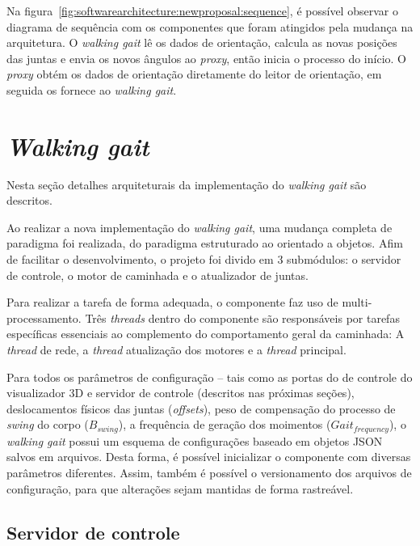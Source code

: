 Na figura~\ref{fig:softwarearchitecture:newproposal:sequence}, é possível observar o diagrama de sequência com os componentes que foram atingidos pela mudança na arquitetura. O \textit{walking gait} lê os dados de orientação, calcula as novas posições das juntas e envia os novos ângulos ao \textit{proxy}, então inicia o processo do início. O \textit{proxy} obtém os dados de orientação diretamente do leitor de orientação, em seguida os fornece ao \textit{walking gait}.

\section{\textit{Walking gait}}

Nesta seção detalhes arquiteturais da implementação do \textit{walking gait} são descritos.

Ao realizar a nova implementação do \textit{walking gait}, uma mudança completa de paradigma foi realizada, do paradigma estruturado ao orientado a objetos. Afim de facilitar o desenvolvimento, o projeto foi divido em $3$ submódulos: o servidor de controle, o motor de caminhada e o atualizador de juntas.

Para realizar a tarefa de forma adequada, o componente faz uso de multi-processamento. Três \textit{threads} dentro do componente são responsáveis por tarefas específicas essenciais ao complemento do comportamento geral da caminhada: A \textit{thread} de rede, a \textit{thread} atualização dos motores e a \textit{thread} principal.

Para todos os parâmetros de configuração -- tais como as portas do de controle do visualizador 3D e servidor de controle (descritos nas próximas seções), deslocamentos físicos das juntas (\textit{offsets}), peso de compensação do processo de  \textit{swing} do corpo ($B_{swing}$), a frequência de geração dos moimentos ($Gait_{frequency}$), o \textit{walking gait} possui um esquema de configurações baseado em objetos JSON salvos em arquivos. Desta forma, é possível inicializar o componente com diversas parâmetros diferentes. Assim, também é possível o versionamento dos arquivos de configuração, para que alterações sejam mantidas de forma rastreável.

\subsection{Servidor de controle}
\label{subsec:architecture:walkinggait:controlserver}

